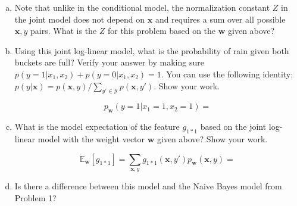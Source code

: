 \documentclass[a4paper,fleqn]{article}
\renewcommand{\vec}{\mathbf}
\begin{document}
\begin{enumerate}[(a)]
\item Note that unlike in the conditional model, the normalization
  constant $Z$ in the joint model does not depend on $\vec{x}$ and
  requires a sum over all possible $\vec{x},y$ pairs.  What is the $Z$
  for this problem based on the $\vec{w}$ given above?

\vspace*{2cm}

\item Using this joint log-linear model, what is the probability of
  rain given both buckets are full?  Verify your answer by making sure
  $p(y=1|x_1,x_2) + p(y=0|x_1,x_2) = 1$.  You can use the following
  identity: $ p(y|\vec{x}) =
  p(\vec{x},y)/\sum_{y'\in\mathcal{Y}}p(\vec{x},y')$.  Show your work.

\[ p_\vec{w}(y=1 | x_1=1, x_2=1)= \]
\vspace*{1cm}

\item What is the model expectation of the feature $g_{1*1}$ based on
  the joint log-linear model with the weight vector $\vec{w}$
  given above?  Show your work.

\[\mathbb{E}_{\vec{w}} [g_{1*1}] =
\sum_{\vec{x},y} g_{1*1}(\vec{x}, y') p_\vec{w}(\vec{x}, y) =
\]
\vspace*{2cm}

\item Is there a difference between this model and the Naive Bayes
  model from Problem 1?
\end{enumerate}
\end{document}
